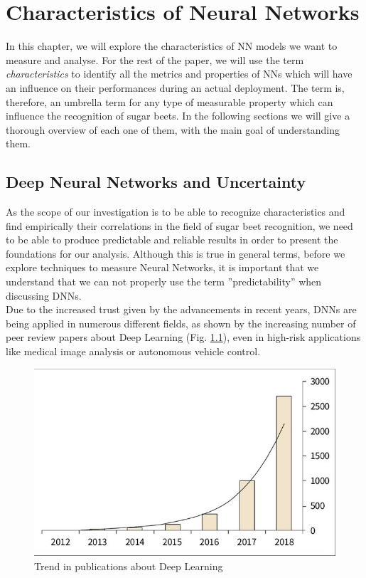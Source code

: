 \chapter{Characteristics of Neural Networks}\label{char_nn}
In this chapter, we will explore the characteristics of NN models we want to measure and analyse. For the rest of the paper, we will use the term \textit{characteristics} to identify all the metrics and properties of NNs which will have an influence on their performances during an actual deployment. The term is, therefore, an umbrella term for any type of measurable property which can influence the recognition of sugar beets. In the following sections we will give a thorough overview of each one of them, with the main goal of understanding them. 

\section{Deep Neural Networks and Uncertainty}
As the scope of our investigation is to be able to recognize characteristics and find empirically their correlations in the field of sugar beet recognition, we need to be able to produce predictable and reliable results in order to present the foundations for our analysis. Although this is true in general terms, before we explore techniques to measure Neural Networks, it is important that we understand that we can not properly use the term ''predictability'' when discussing DNNs. \\
Due to the increased trust given by the advancements in recent years, DNNs are being applied in numerous different fields, as shown by the increasing number of peer review papers about Deep Learning (Fig. \ref{fig:annual_trend}), even in high-risk applications
like medical image analysis or autonomous vehicle control. \cite{gawlikowski2021survey}
\begin{figure}[h]
    \centering
    \includegraphics{img/Annual-trend-in-the-number-of-papers-related-to-deep-learning-in-the-medical-field_W640.jpg}
    \caption[Trend in publications about Deep Learning]{Trend in publications about Deep Learning  \cite{Number_of_DL_papers}}
    \label{fig:annual_trend}
\end{figure}


